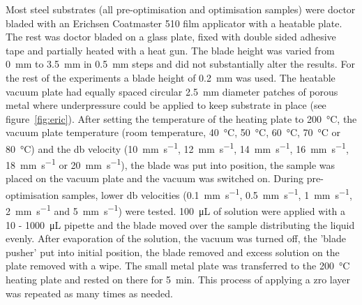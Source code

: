 \documentclass[a4paper]{article}
\newcommand{\ul}[1]{\SI{#1}{\micro\liter}}
\newcommand{\minutes}[1]{\SI{#1}{\minute}}
\newcommand{\mmps}[1]{\SI{#1}{\milli\meter\per\second}}
\begin{document}
Most
steel substrates (all pre-optimisation and optimisation samples) were doctor bladed with 
an Erichsen Coatmaster 510 film applicator with a heatable plate.
The rest was doctor bladed on a glass plate, fixed with double sided adhesive tape and 
partially heated with a heat gun.
The blade height was varied from \SI{0}{\milli\meter} to \SI{3.5}{\milli\meter} in 
\SI{0.5}{\milli\meter} steps and did not substantially alter the results.
For the rest of the experiments a blade height of \SI{0.2}{\milli\meter} was used.
The heatable vacuum plate 
had equally spaced circular \SI{2.5}{\milli\meter} diameter patches of porous metal where 
underpressure could be applied to keep substrate in place (see 
figure~\ref{fig:eric}). After setting the temperature of the heating plate to 
\SI{200}{\celsius}, the vacuum plate temperature (room temperature, \SI{40}{\celsius}, 
\SI{50}{\celsius}, \SI{60}{\celsius}, \SI{70}{\celsius} or \SI{80}{\celsius}) and the 
\gls{db} velocity (\mmps{10}, \mmps{12}, \mmps{14}, \mmps{16}, \mmps{18} or \mmps{20}), 
the blade was put into position, the sample was placed on the vacuum plate and the vacuum 
was switched on. 
During pre-optimisation samples, lower \gls{db} velocities (\mmps{0.1}, \mmps{0.5}, 
\mmps{1}, \mmps{2} and \mmps{5}) were tested. 
\ul{100} of solution were 
applied with a 10 - \ul{1000} pipette and the blade moved over the sample distributing the 
liquid evenly. After evaporation of the solution, the vacuum was turned off, the 'blade 
pusher' put into initial position, the blade removed and excess solution on the plate 
removed with a 
wipe. The small metal plate was transferred to the \SI{200}{\celsius} heating plate and 
rested on there for \minutes{5}. 
This process of applying a \gls{zro} layer was repeated as many times as needed.
\end{document}
